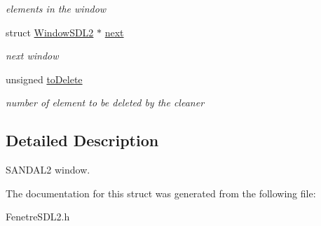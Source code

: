 \begin{DoxyCompactItemize}
\begin{DoxyCompactList}\small\item\em elements in the window \end{DoxyCompactList}\item 
struct \hyperlink{structWindowSDL2}{Window\+S\+D\+L2} $\ast$ \hyperlink{structWindowSDL2_a9f377dedae284ebaedb2d4c4702737ea}{next}\hypertarget{structWindowSDL2_a9f377dedae284ebaedb2d4c4702737ea}{}\label{structWindowSDL2_a9f377dedae284ebaedb2d4c4702737ea}

\begin{DoxyCompactList}\small\item\em next window \end{DoxyCompactList}\item 
unsigned \hyperlink{structWindowSDL2_a83f3e9f38d1171818525f22fc7b32080}{to\+Delete}\hypertarget{structWindowSDL2_a83f3e9f38d1171818525f22fc7b32080}{}\label{structWindowSDL2_a83f3e9f38d1171818525f22fc7b32080}

\begin{DoxyCompactList}\small\item\em number of element to be deleted by the cleaner \end{DoxyCompactList}\end{DoxyCompactItemize}


\subsection{Detailed Description}
S\+A\+N\+D\+A\+L2 window. 

The documentation for this struct was generated from the following file\+:\begin{DoxyCompactItemize}
\item 
Fenetre\+S\+D\+L2.\+h\end{DoxyCompactItemize}
